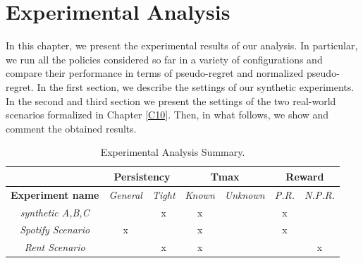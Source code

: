 \chapter{Experimental Analysis}\label{C11}

In this chapter, we present the experimental results of our analysis. In particular, we run all the policies considered so far in a variety of configurations and compare their performance in terms of pseudo-regret and normalized pseudo-regret. In the first section, we describe the settings of our synthetic experiments. In the second and third section we present the settings of the two real-world scenarios formalized in Chapter \ref{C10}. Then, in what follows, we show and comment the obtained results.


\begin{table}[h]
	\centering
	\caption{Experimental Analysis Summary.}
	\begin{tabular}{|c|c|c|c|c|c|c|} 
		\hhline{~------|}
		\multicolumn{1}{l|}{}     & \multicolumn{2}{c|}{{\cellcolor[rgb]{0.878,0.878,0.878}}\textbf{Persistency}}                              & \multicolumn{2}{c|}{\textbf{Tmax}} & \multicolumn{2}{c|}{{\cellcolor[rgb]{0.878,0.878,0.878}}\textbf{Reward}}                                 \\ 
		\hline
		\textbf{Experiment name}  & {\cellcolor[rgb]{0.878,0.878,0.878}}\textit{General} & {\cellcolor[rgb]{0.878,0.878,0.878}}\textit{Tight} & \textit{Known} & \textit{Unknown}  & {\cellcolor[rgb]{0.878,0.878,0.878}}\textit{P.R.} & {\cellcolor[rgb]{0.878,0.878,0.878}}\textit{N.P.R.}  \\ 
		\hline
		\textit{synthetic A,B,C}      & {\cellcolor[rgb]{0.878,0.878,0.878}}                 & {\cellcolor[rgb]{0.878,0.878,0.878}}x               & x              &                   & {\cellcolor[rgb]{0.878,0.878,0.878}}x             & {\cellcolor[rgb]{0.878,0.878,0.878}}                 \\ 
		\hline
		\textit{Spotify Scenario} & {\cellcolor[rgb]{0.878,0.878,0.878}}x                & {\cellcolor[rgb]{0.878,0.878,0.878}}                & x              &                   & {\cellcolor[rgb]{0.878,0.878,0.878}}x             & {\cellcolor[rgb]{0.878,0.878,0.878}}                 \\ 
		\hline
		\textit{Rent Scenario}    & {\cellcolor[rgb]{0.878,0.878,0.878}}                 & {\cellcolor[rgb]{0.878,0.878,0.878}}x               & x              &                   & {\cellcolor[rgb]{0.878,0.878,0.878}}              & {\cellcolor[rgb]{0.878,0.878,0.878}}x                \\
		\hline
	\end{tabular}

\end{table}

